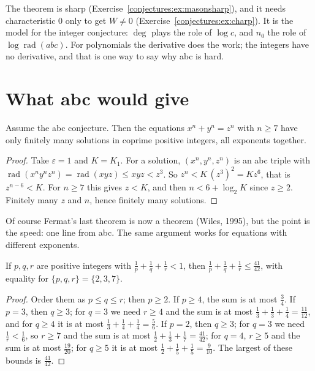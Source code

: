 The theorem is sharp (Exercise~\ref{conjectures:ex:masonsharp}), and it needs characteristic $0$ only to get $W\ne0$ (Exercise~\ref{conjectures:ex:charp}). It is the model for the
integer conjecture: $\deg$ plays the role of $\log c$, and $n_0$ the role of $\log\operatorname{rad}(abc)$. For polynomials the derivative does the work; the
integers have no derivative, and that is one way to say why abc is hard.

\section{What abc would give}

\begin{proposition}\label{conjectures:prop:abcfermat}
Assume the abc conjecture. Then the equations $x^n+y^n=z^n$ with $n\ge7$ have only finitely many solutions in coprime positive integers, all exponents
together.
\end{proposition}
\begin{proof}
Take $\varepsilon=1$ and $K=K_1$. For a solution, $(x^n,y^n,z^n)$ is an abc triple with $\operatorname{rad}(x^ny^nz^n)=\operatorname{rad}(xyz)\le xyz<z^3$. So
$z^n<K\,(z^3)^2=Kz^6$, that is $z^{n-6}<K$. For $n\ge7$ this gives $z<K$, and then $n<6+\log_2K$ since $z\ge2$. Finitely many $z$ and $n$, hence
finitely many solutions.
\end{proof}

Of course Fermat's last theorem is now a theorem (Wiles, 1995), but the point is the speed: one line from abc. The same argument works for equations
with different exponents.

\begin{lemma}\label{conjectures:lem:4142}
If $p,q,r$ are positive integers with $\frac1p+\frac1q+\frac1r<1$, then $\frac1p+\frac1q+\frac1r\le\frac{41}{42}$, with equality for $\{p,q,r\}=\{2,3,7\}$.
\end{lemma}
\begin{proof}
Order them as $p\le q\le r$; then $p\ge2$. If $p\ge4$, the sum is at most $\frac34$. If $p=3$, then $q\ge3$; for $q=3$ we need $r\ge4$ and the sum is at most
$\frac1{3}+\frac13+\frac14=\frac{11}{12}$, and for $q\ge4$ it is at most $\frac13+\frac14+\frac14=\frac56$. If $p=2$, then $q\ge3$; for $q=3$ we need
$\frac1r<\frac16$, so $r\ge7$ and the sum is at most $\frac12+\frac13+\frac17=\frac{41}{42}$; for $q=4$, $r\ge5$ and the sum is at most $\frac{19}{20}$; for
$q\ge5$ it is at most $\frac12+\frac15+\frac15=\frac9{10}$. The largest of these bounds is $\frac{41}{42}$.
\end{proof}

